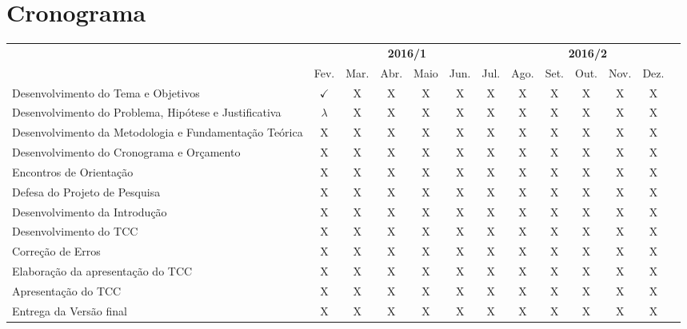 \section{Cronograma}\label{lcronograma}

\begin{adjustbox}{center}
  \tiny
  \begin{tabular}{|p{4cm}|c|c|c|c|c|c|c|c|c|c|c|l|}
    \cline{1-12}
      \multicolumn{1}{|c|}{
        \multirow{2}{*}{
          \diagbox[width=4.4cm]{
            \textbf{Atividades}
          }{
            \textbf{Ano/Mês}
          }}}
      & \multicolumn{6}{c|}{\textbf{2016/1}}
      & \multicolumn{5}{c|}{\textbf{2016/2}} \\
      \cline{2-12}
      & Fev. & Mar. & Abr. & Maio & Jun. & Jul. & Ago. & Set. & Out. & Nov. & Dez. \\
    \hline
      Desenvolvimento do Tema e Objetivos
      & $\checkmark$ & X & X & X & X & X & X & X & X & X & X \\
    \hline
      Desenvolvimento do Problema, Hipótese e Justificativa
      & $\lambda$ & X & X & X & X & X & X & X & X & X & X \\
    \hline
      Desenvolvimento da Metodologia e Fundamentação Teórica
      & X & X & X & X & X & X & X & X & X & X & X \\
    \hline
      Desenvolvimento do Cronograma e Orçamento
      & X & X & X & X & X & X & X & X & X & X & X \\
    \hline
      Encontros de Orientação
      & X & X & X & X & X & X & X & X & X & X & X \\
    \hline
      Defesa do Projeto de Pesquisa
      & X & X & X & X & X & X & X & X & X & X & X \\
    \hline
      Desenvolvimento da Introdução
      & X & X & X & X & X & X & X & X & X & X & X \\
    \hline
      Desenvolvimento do TCC
      & X & X & X & X & X & X & X & X & X & X & X \\
    \hline
      Correção de Erros
      & X & X & X & X & X & X & X & X & X & X & X \\
    \hline
      Elaboração da apresentação do TCC
      & X & X & X & X & X & X & X & X & X & X & X \\
    \hline
      Apresentação do TCC
      & X & X & X & X & X & X & X & X & X & X & X \\
    \hline
      Entrega da Versão final
      & X & X & X & X & X & X & X & X & X & X & X \\
    \hline
  \end{tabular}
\end{adjustbox}
